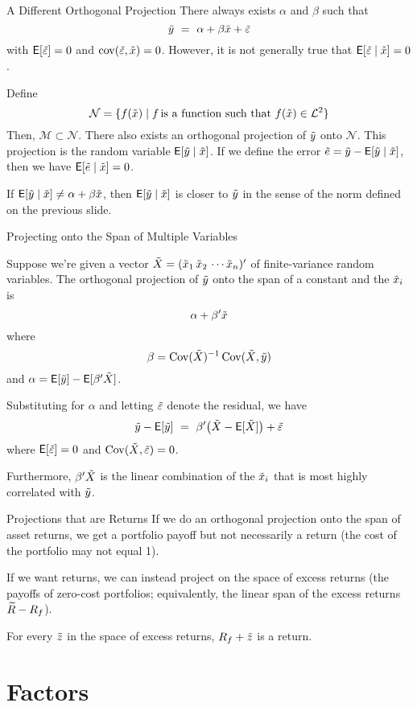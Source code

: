 \begin{frame}{A Different Orthogonal Projection}
There always exists $\alpha$ and $\beta$ such that
$$\tilde{y} \ = \ \alpha + \beta \tilde{x} + \tilde{\varepsilon}$$
with $\mathsf{E}[\tilde{\varepsilon}]= 0$ and $\operatorname{cov}(\tilde{\varepsilon},\tilde{x})=0$.
However, it is not generally true that $\mathsf{E}[\tilde{\varepsilon} \mid \tilde{x}] = 0$.

Define 
$$\mathcal{N} = \{f(\tilde{x}) \mid f \text{\,is a function such that $f(\tilde{x}) \in \mathcal{L}^2$}\}$$  Then, $\mathcal{M} \subset \mathcal{N}$.  There also exists an orthogonal projection of $\tilde{y}$ onto $\mathcal{N}$.  This projection is the random variable $\mathsf{E}[\tilde{y} \mid \tilde{x}]$.  If we define the error $\tilde{e} = \tilde{y} - \mathsf{E}[\tilde{y} \mid \tilde{x}]$, then we have $\mathsf{E}[\tilde{e} \mid \tilde{x}] = 0$.

If $\mathsf{E}[\tilde{y} \mid \tilde{x}] \neq \alpha + \beta \tilde{x}$, then $\mathsf{E}[\tilde{y} \mid \tilde{x}]$ is closer to $\tilde{y}$ in the sense of the norm defined on the previous slide.
\end{frame}


\begin{frame}{Projecting onto the Span of Multiple Variables}

Suppose we're given a vector $\tilde{X} = (\tilde{x}_1 \, \tilde{x}_2 \, \cdots \tilde{x}_n)'$ of finite-variance random variables.  The orthogonal projection of $\tilde{y}$ onto the span of a constant and the $\tilde{x}_i$ is
$$\alpha + \beta'\tilde{x}$$
where
$$\beta = \operatorname{Cov}(\tilde{X})^{-1}\operatorname{Cov}(\tilde{X},\tilde{y})$$
and $\alpha = \mathsf{E}[\tilde{y}] - \mathsf{E}[\beta'\tilde{X}]$. 

Substituting for $\alpha$ and letting $\tilde{\varepsilon}$ denote the residual, we have
$$\ty - \mye[\ty] \ = \ \beta'\big(\tX - \mye[\tX]\big) + \tve$$
where $\mathsf{E}[\tilde{\varepsilon}]=0$ and $\operatorname{Cov}(\tilde{X},\tilde{\varepsilon})=0$.

Furthermore, $\beta'\tilde{X}$ is the linear combination of the $\tilde{x}_i$ that is most highly correlated with $\tilde{y}$.
\end{frame}

\begin{frame}{Projections that are Returns}
If we do an orthogonal projection onto the span of asset returns, we get a portfolio payoff but not necessarily a return (the cost of the portfolio may not equal 1).

If we want returns, we can instead project on the space of excess returns (the payoffs of zero-cost portfolios; equivalently, the linear span of the excess returns $\widetilde{R}-R_f$).  

For every $\tilde{z}$ in the space of excess returns, $R_f + \tilde{z}$ is a return.
\end{frame}

\section{Factors}\subsection{}

